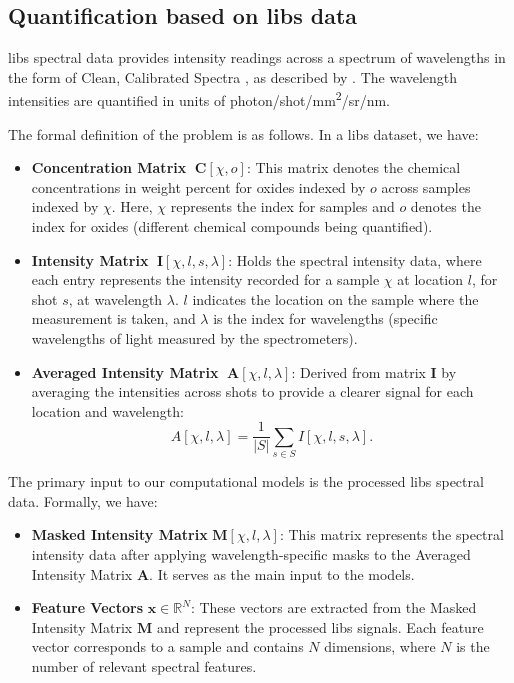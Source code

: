 \subsection{Quantification based on \gls{libs} data}
\gls{libs} spectral data provides intensity readings across a spectrum of wavelengths in the form of Clean, Calibrated Spectra \cite{andersonImprovedAccuracyQuantitative2017}, as described by \citet{wiensPreflightCalibrationInitial2013}.
The wavelength intensities are quantified in units of photon/shot/mm\textsuperscript{2}/sr/nm.

The formal definition of the problem is as follows.
In a \gls{libs} dataset, we have:
\begin{itemize}[topsep=0pt]
    \item \textbf{Concentration Matrix} $\;\mathbf{C}[\chi, o]$: This matrix denotes the chemical concentrations in weight percent for oxides indexed by $o$ across samples indexed by $\chi$. Here, $\chi$ represents the index for samples and $o$ denotes the index for oxides (different chemical compounds being quantified).
    \label{matrix:concentration}

    \item \textbf{Intensity Matrix} $\;\mathbf{I}[\chi, l, s, \lambda]$: Holds the spectral intensity data, where each entry represents the intensity recorded for a sample $\chi$ at location $l$, for shot $s$, at wavelength $\lambda$. $l$ indicates the location on the sample where the measurement is taken, and $\lambda$ is the index for wavelengths (specific wavelengths of light measured by the spectrometers).
    \label{matrix:intensity}

    \item \textbf{Averaged Intensity Matrix} $\;\mathbf{A}[\chi, l, \lambda]$: Derived from matrix $\mathbf{I}$ by averaging the intensities across shots to provide a clearer signal for each location and wavelength:
    \[
    A[\chi, l, \lambda] = \frac{1}{|S|} \sum_{s \in S} I[\chi, l, s, \lambda].
    \]
    \label{matrix:averaged_intensity}
\end{itemize}

The primary input to our computational models is the processed \gls{libs} spectral data.
Formally, we have:
\begin{itemize}
    \item \textbf{Masked Intensity Matrix} $\mathbf{M}[\chi, l, \lambda]$: This matrix represents the spectral intensity data after applying wavelength-specific masks to the Averaged Intensity Matrix $\mathbf{A}$. It serves as the main input to the models.
    \item \textbf{Feature Vectors} $\mathbf{x} \in \mathbb{R}^N$: These vectors are extracted from the Masked Intensity Matrix $\mathbf{M}$ and represent the processed \gls{libs} signals. Each feature vector corresponds to a sample and contains $N$ dimensions, where $N$ is the number of relevant spectral features.
\end{itemize}

